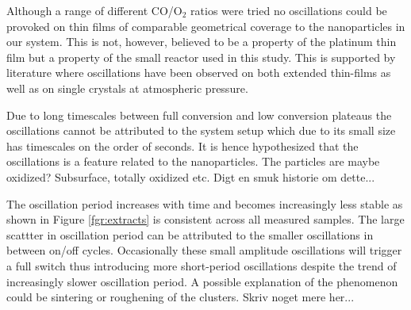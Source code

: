 \documentclass[8.5pt,twoside,twocolumn]{article}
\begin{document}
Although a range of different CO/O$_2$ ratios were tried no oscillations could be provoked on thin films of comparable geometrical coverage to the nanoparticles in our system. This is not, however, believed to be a property of the platinum thin film but a property of the small reactor used in this study. This is supported by literature where oscillations have been observed on both extended thin-films \cite{Singh2010} as well as on single crystals \cite{Hendriksen2005} at atmospheric pressure.

Due to long timescales between full conversion and low conversion plateaus the oscillations cannot be attributed to the system setup which due to its small size has timescales on the order of seconds. It is hence hypothesized that the oscillations is a feature related to the nanoparticles. The particles are maybe oxidized? Subsurface, totally oxidized etc. Digt en smuk historie om dette...


The oscillation period increases with time and becomes increasingly less stable as shown in Figure \ref{fgr:extracts} is consistent across all measured samples. The large scattter in oscillation period can be attributed to the smaller oscillations in between on/off cycles. Occasionally these small amplitude oscillations will trigger a full switch thus introducing more short-period oscillations despite the trend of increasingly slower oscillation period. A possible explanation of the phenomenon could be sintering or roughening of the clusters. Skriv noget mere her...




\end{document}
